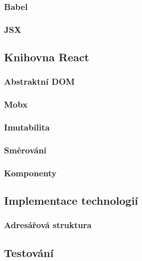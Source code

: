 \documentclass[a4paper,11pt,titlepage,fleqn]{article}
\begin{document}
        \subsubsection{Babel}
        \subsubsection{JSX}


    \subsection{Knihovna React}
        
        \subsubsection{Abstraktní DOM}
        \subsubsection{Mobx}
        \subsubsection{Imutabilita}
        \subsubsection{Směrování}
        \subsubsection{Komponenty}


    \subsection{Implementace technologií}

        \subsubsection{Adresářová struktura}
        

    \subsection{Testování}
\end{document}
